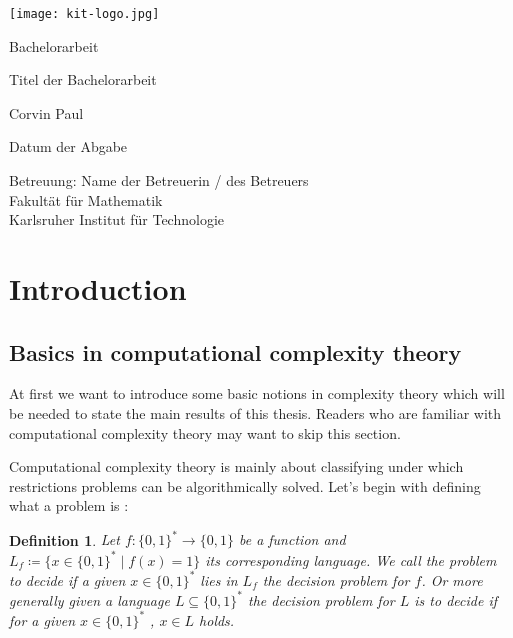 \documentclass[12pt,a4paper]{scrartcl}
\newtheorem{Definition}[Theorem]{Definition}
\numberwithin{equation}{section}
\begin{document}
  \pagestyle{empty}

  \begin{titlepage}

    \texttt{[image: kit-logo.jpg]} 
    \vspace*{2cm} 

 \begin{center} \large 
    
    Bachelorarbeit
    \vspace*{2cm}

    {\huge Titel der Bachelorarbeit}
    \vspace*{2.5cm}

    Corvin Paul
    \vspace*{1.5cm}

    Datum der Abgabe
    \vspace*{4.5cm}


    Betreuung: Name der Betreuerin / des Betreuers \\[1cm]
    Fakultät für Mathematik \\[1cm]
		Karlsruher Institut für Technologie
  \end{center}
\end{titlepage}



  \tableofcontents

\newpage
 


  \pagestyle{headings}

\section{Introduction}

\subsection{Basics in computational complexity theory}
At first we want to introduce some basic notions in complexity theory which will be needed to state the main results of this thesis.
Readers who are familiar with computational complexity theory may want to skip this section.

Computational complexity theory is mainly about classifying under which restrictions problems can be algorithmically solved.
Let's begin with defining what a problem is :

\begin{Definition}
 Let $f \colon {\lbrace 0,1 \rbrace}^* \to {\lbrace 0,1 \rbrace}$ be a function and $L_f \coloneqq {\lbrace 
 x \in {\lbrace 0,1 \rbrace}^*  \; | \; f(x) = 1 \rbrace} $ its corresponding language. We call the 
 problem to decide if a given $x \in {\lbrace 0,1 \rbrace}^*$ lies in $L_f$ the \emph{decision problem} for $f$.
 Or more generally given a language $L \subseteq {\lbrace 0,1 \rbrace}^*$ the decision problem for $L$ is to decide
 if for a given $x \in {\lbrace 0,1 \rbrace}^* $ , $x \in L$ holds.
\end{Definition}
\end{document}
